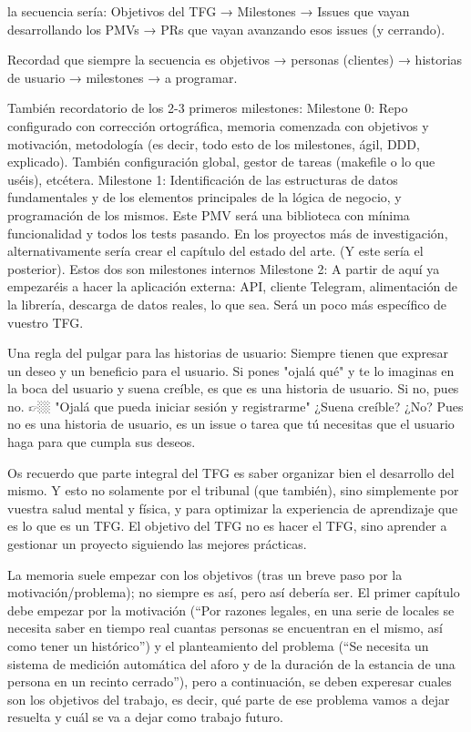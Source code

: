 la secuencia sería:
Objetivos del TFG → Milestones → Issues que vayan desarrollando los PMVs → PRs que vayan avanzando esos issues (y cerrando).

Recordad que siempre la secuencia es objetivos → personas (clientes) → historias de usuario → milestones → a programar.

También recordatorio de los 2-3 primeros milestones:
Milestone 0: Repo configurado con corrección ortográfica, memoria comenzada con objetivos y motivación, metodología (es decir, todo esto de los milestones, ágil, DDD, explicado). También configuración global, gestor de tareas (makefile o lo que uséis), etcétera.
Milestone 1: Identificación de las estructuras de datos fundamentales y de los elementos principales de la lógica de negocio, y programación de los mismos. Este PMV será una biblioteca con mínima funcionalidad y todos los tests pasando. En los proyectos más de investigación, alternativamente sería crear el capítulo del estado del arte. (Y este sería el posterior). Estos dos son milestones internos
Milestone 2: A partir de aquí ya empezaréis a hacer la aplicación externa: API, cliente Telegram, alimentación de la librería, descarga de datos reales, lo que sea. Será un poco más específico de vuestro  TFG.

Una regla del pulgar para las historias de usuario: Siempre tienen que expresar un deseo y un beneficio para el usuario. Si pones "ojalá qué" y te lo imaginas en la boca del usuario y suena creíble, es que es una historia de usuario. Si no, pues no.
👉🏼 "Ojalá que pueda iniciar sesión y registrarme" ¿Suena creíble? ¿No? Pues no es una historia de usuario, es un issue o tarea que tú necesitas que el usuario haga para que cumpla sus deseos.

Os recuerdo que parte integral del TFG es saber organizar bien el desarrollo del mismo. Y esto no solamente por el tribunal (que también), sino simplemente por vuestra salud mental y física, y para optimizar la experiencia de aprendizaje que es lo que es un TFG. El objetivo del TFG no es hacer el TFG, sino aprender a gestionar un proyecto siguiendo las mejores prácticas.

La memoria suele empezar con los objetivos (tras un breve paso por la motivación/problema); no siempre es así, pero así debería ser. El primer capítulo debe empezar por la motivación (“Por razones legales, en una serie de locales se necesita saber en tiempo real cuantas personas se encuentran en el mismo, así como tener un histórico”) y el planteamiento del problema (“Se necesita un sistema de medición automática del aforo y de la duración de la estancia de una persona en un recinto cerrado”), pero a continuación, se deben experesar cuales son los objetivos del trabajo, es decir, qué parte de ese problema vamos a dejar resuelta y cuál se va a dejar como trabajo futuro.


